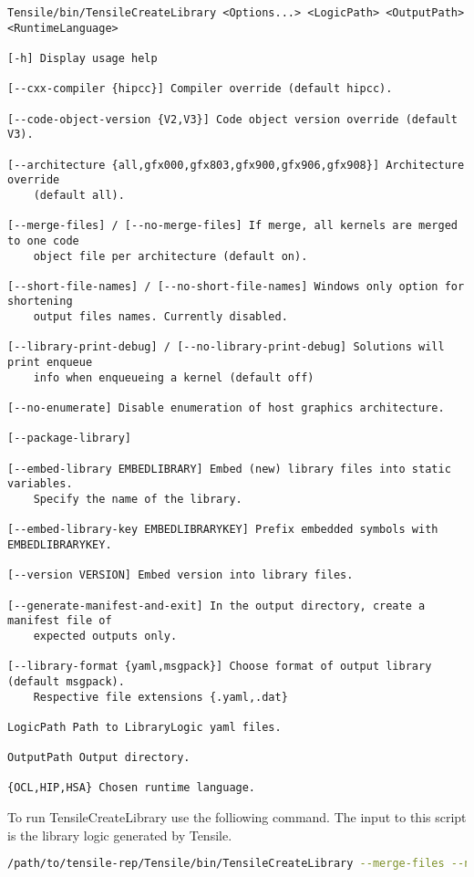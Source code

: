 \documentclass[]{article}
\begin{document}
\begin{lstlisting}
Tensile/bin/TensileCreateLibrary <Options...> <LogicPath> <OutputPath> <RuntimeLanguage>

[-h] Display usage help

[--cxx-compiler {hipcc}] Compiler override (default hipcc).

[--code-object-version {V2,V3}] Code object version override (default V3).

[--architecture {all,gfx000,gfx803,gfx900,gfx906,gfx908}] Architecture override
    (default all).

[--merge-files] / [--no-merge-files] If merge, all kernels are merged to one code
    object file per architecture (default on).

[--short-file-names] / [--no-short-file-names] Windows only option for shortening
    output files names. Currently disabled.

[--library-print-debug] / [--no-library-print-debug] Solutions will print enqueue
    info when enqueueing a kernel (default off)

[--no-enumerate] Disable enumeration of host graphics architecture.

[--package-library]

[--embed-library EMBEDLIBRARY] Embed (new) library files into static variables.
    Specify the name of the library.

[--embed-library-key EMBEDLIBRARYKEY] Prefix embedded symbols with EMBEDLIBRARYKEY.

[--version VERSION] Embed version into library files.

[--generate-manifest-and-exit] In the output directory, create a manifest file of
    expected outputs only.

[--library-format {yaml,msgpack}] Choose format of output library (default msgpack).
    Respective file extensions {.yaml,.dat}

LogicPath Path to LibraryLogic yaml files.

OutputPath Output directory.

{OCL,HIP,HSA} Chosen runtime language.
\end{lstlisting}

\noindent
To run TensileCreateLibrary use the folliowing command. The input to this script is the library logic generated by Tensile.

\begin{lstlisting}[language=bash]
/path/to/tensile-rep/Tensile/bin/TensileCreateLibrary --merge-files --no-short-file-names --no-library-print-debug --code-object-version=V3 --cxx-compiler=hipcc --library-format=msgpack path/to/new/logic path/to/drop/new/tensile HIP
\end{lstlisting}
\end{document}
